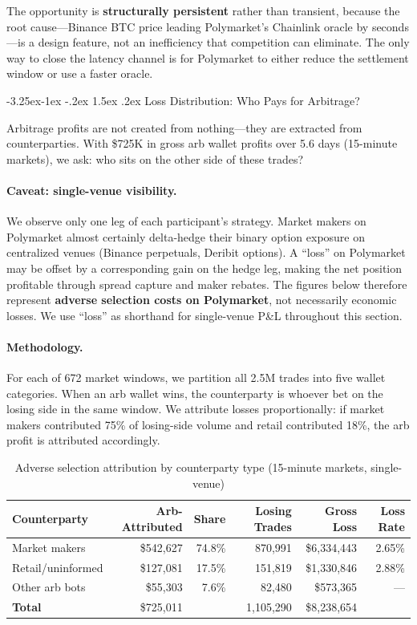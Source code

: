 \documentclass[11pt,a4paper]{article}
\makeatletter
\renewcommand\subsection{\@startsection{subsection}{2}{\z@}%
  {-3.25ex\@plus -1ex \@minus -.2ex}%
  {1.5ex \@plus .2ex}%
  {\normalfont\large\bfseries}}
\makeatother
\begin{document}
The opportunity is \textbf{structurally persistent} rather than transient, because the root cause---Binance BTC price leading Polymarket's Chainlink oracle by seconds---is a design feature, not an inefficiency that competition can eliminate. The only way to close the latency channel is for Polymarket to either reduce the settlement window or use a faster oracle.

\subsection{Loss Distribution: Who Pays for Arbitrage?}

Arbitrage profits are not created from nothing---they are extracted from counterparties. With \$725K in gross arb wallet profits over 5.6 days (15-minute markets), we ask: who sits on the other side of these trades?

\paragraph{Caveat: single-venue visibility.} We observe only one leg of each participant's strategy. Market makers on Polymarket almost certainly delta-hedge their binary option exposure on centralized venues (Binance perpetuals, Deribit options). A ``loss'' on Polymarket may be offset by a corresponding gain on the hedge leg, making the net position profitable through spread capture and maker rebates. The figures below therefore represent \textbf{adverse selection costs on Polymarket}, not necessarily economic losses. We use ``loss'' as shorthand for single-venue P\&L throughout this section.

\paragraph{Methodology.} For each of 672 market windows, we partition all 2.5M trades into five wallet categories. When an arb wallet wins, the counterparty is whoever bet on the losing side in the same window. We attribute losses proportionally: if market makers contributed 75\% of losing-side volume and retail contributed 18\%, the arb profit is attributed accordingly.

\begin{table}[H]
\centering
\caption{Adverse selection attribution by counterparty type (15-minute markets, single-venue)}
\label{tab:losses}
\begin{tabular}{@{}lrrrrr@{}}
\toprule
\textbf{Counterparty} & \textbf{Arb-Attributed} & \textbf{Share} & \textbf{Losing Trades} & \textbf{Gross Loss} & \textbf{Loss Rate} \\
\midrule
Market makers     & \$542,627  & 74.8\% & 870,991  & \$6,334,443  & 2.65\%  \\
Retail/uninformed & \$127,081  & 17.5\% & 151,819  & \$1,330,846  & 2.88\%  \\
Other arb bots    & \$55,303   & 7.6\%  & 82,480   & \$573,365    & ---     \\
\midrule
\textbf{Total}    & \$725,011  &        & 1,105,290 & \$8,238,654 &         \\
\bottomrule
\end{tabular}
\end{table}
\end{document}
